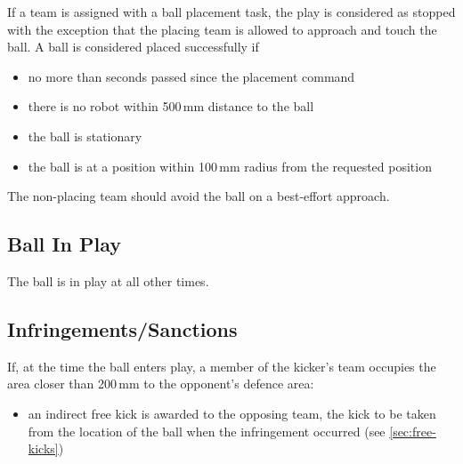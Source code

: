 
If a team is assigned with a ball placement task, the play is considered as stopped
with the exception that the placing team is allowed to approach and touch the ball.
A ball is considered placed successfully if

\begin{itemize}
\item no more than   seconds passed since the placement command
\item there is no robot within 500\,mm distance to the ball
\item the ball is stationary
\item the ball is at a position within 100\,mm radius from the requested position
\end{itemize}


The non-placing team should avoid the ball on a best-effort approach.



\subsection{Ball In Play}
The ball is in play at all other times.

\subsection{Infringements/Sanctions}
If, at the time the ball enters play, a member of the kicker's team occupies the area closer than 200\,mm to the opponent's defence area:
\begin{itemize}
\item an indirect free kick is awarded to the opposing team, the kick to be taken from the location of the ball when the infringement occurred (see \autoref{sec:free-kicks})
\end{itemize}

